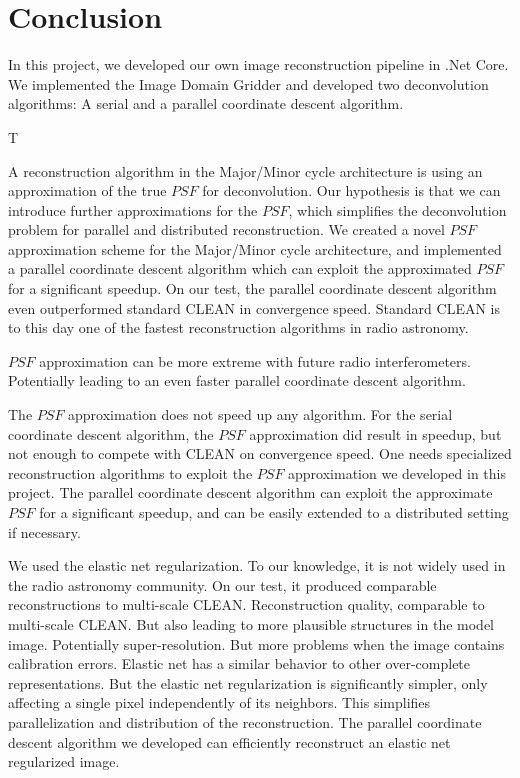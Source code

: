 \section{Conclusion}
In this project, we developed our own image reconstruction pipeline in .Net Core. We implemented the Image Domain Gridder\cite{veenboer2017image} and developed two deconvolution algorithms: A serial and a parallel coordinate descent algorithm.

T

A reconstruction algorithm in the Major/Minor cycle architecture is using an approximation of the true $PSF$ for deconvolution. Our hypothesis is that we can introduce further approximations for the $PSF$, which simplifies the deconvolution problem for parallel and distributed reconstruction. We created a novel $PSF$ approximation scheme for the Major/Minor cycle architecture, and implemented a parallel coordinate descent algorithm which can exploit the approximated  $PSF$ for a significant speedup. On our test, the parallel coordinate descent algorithm even outperformed standard CLEAN in convergence speed. Standard CLEAN is to this day one of the fastest reconstruction algorithms in radio astronomy.

$PSF$ approximation can be more extreme with future radio interferometers. Potentially leading to an even faster parallel coordinate descent algorithm.

The $PSF$ approximation does not speed up any algorithm. For the serial coordinate descent algorithm, the $PSF$ approximation did result in speedup, but not enough to compete with CLEAN on convergence speed. One needs specialized reconstruction algorithms to exploit the $PSF$ approximation we developed in this project. The parallel coordinate descent algorithm can exploit the approximate $PSF$ for a significant speedup, and can be easily extended to a distributed setting if necessary.

We used the elastic net regularization. To our knowledge, it is not widely used in the radio astronomy community. On our test, it produced comparable reconstructions to multi-scale CLEAN. Reconstruction quality, comparable to multi-scale CLEAN. But also leading to more plausible structures in the model image. 
Potentially super-resolution.
But more problems when the image contains calibration errors.
Elastic net has a similar behavior to other over-complete representations. But the elastic net regularization is significantly simpler, only affecting a single pixel independently of its neighbors. This simplifies parallelization and distribution of the reconstruction. 
The parallel coordinate descent algorithm we developed can efficiently reconstruct an elastic net regularized image.

